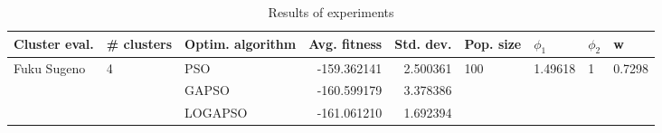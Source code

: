 \begin{table}
\centering
\caption{Results of experiments}
\begin{tabular}{lllrrllll}
\toprule
               Cluster eval. &        \# clusters & Optim. algorithm &  Avg. fitness &  Std. dev. &            Pop. size &               $\phi_{1}$ &         $\phi_{2}$ &                       w \\
\midrule
\multirow{3}{*}{Fuku Sugeno} & \multirow{3}{*}{4} &              PSO &   -159.362141 &   2.500361 & \multirow{3}{*}{100} & \multirow{3}{*}{1.49618} & \multirow{3}{*}{1} & \multirow{3}{*}{0.7298} \\
                             &                    &            GAPSO &   -160.599179 &   3.378386 &                      &                          &                    &                         \\
                             &                    &          LOGAPSO &   -161.061210 &   1.692394 &                      &                          &                    &                         \\
\bottomrule
\end{tabular}
\end{table}
